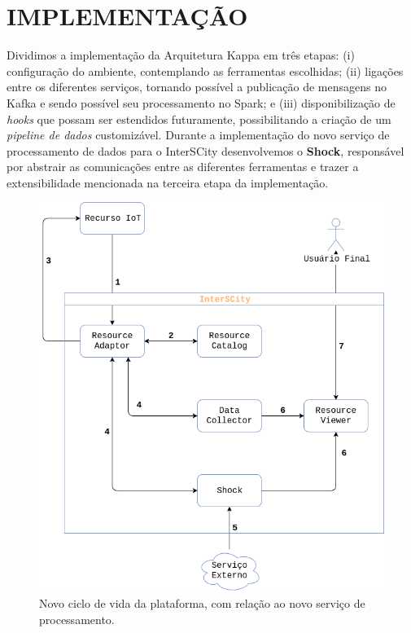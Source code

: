 \section{IMPLEMENTAÇÃO}

Dividimos a implementação da Arquitetura Kappa em três etapas:
(i) configuração do ambiente, contemplando as ferramentas escolhidas;
(ii) ligações entre os diferentes serviços, tornando possível a publicação de
    mensagens no Kafka e sendo possível seu processamento no Spark; e
(iii) disponibilização de \textit{hooks} que possam ser estendidos futuramente,
    possibilitando a criação de um \textit{pipeline de dados} customizável.
Durante a implementação do novo serviço de processamento de dados para o
InterSCity desenvolvemos o \textbf{Shock}, responsável por abstrair as
comunicações entre as diferentes ferramentas e trazer a extensibilidade mencionada
na terceira etapa da implementação.

\begin{figure}
  \centering
    \includegraphics[scale=0.45]{figuras/shock_usage.png}
    \caption{Novo ciclo de vida da plataforma, com relação ao novo serviço de processamento.}
  \label{fig:shock_usage}
\end{figure}

